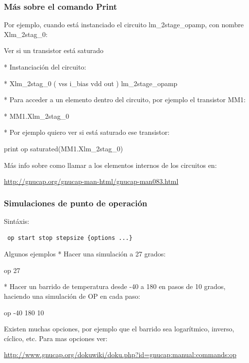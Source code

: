 \documentclass{beamer}
\begin{document}
\begin{frame}
  \frametitle{Más sobre el comando Print}

Por ejemplo, cuando está instanciado el circuito lm\_2stage\_opamp, con nombre Xlm\_2stag\_0:
\begin{exampleblock}{Ver si un transistor está saturado}

 * Instanciación del circuito:

 * Xlm\_2stag\_0 ( vss i\_bias vdd out )  lm\_2stage\_opamp 

 * Para acceder a un elemento dentro del circuito, por ejemplo el transistor MM1:

 * MM1.Xlm\_2stag\_0

 * Por ejemplo quiero ver si está saturado ese transistor:

  print op saturated(MM1.Xlm\_2stag\_0)
\end{exampleblock}
 Más info sobre como llamar a los elementos internos de los circuitos en:
  \begin{footnotesize}
   \url{http://gnucap.org/gnucap-man-html/gnucap-man083.html}
  \end{footnotesize}

\end{frame}
\begin{frame}[fragile]
  \frametitle{Simulaciones de punto de operación}

 Sintáxis:
 \begin{verbatim}
 op start stop stepsize {options ...} 
 \end{verbatim}
 \begin{exampleblock}{Algunos ejemplos}
   * Hacer una simulación a 27 grados:

   op 27

   * Hacer un barrido de temperatura desde -40 a 180 en pasos de 10 grados, haciendo una simulación de OP en cada paso:

   op -40 180 10
 \end{exampleblock}
 Existen muchas opciones, por ejemplo que el barrido sea logarítmico, inverso, cíclico, etc. Para mas opciones ver:
  \begin{tiny}
    \url{http://www.gnucap.org/dokuwiki/doku.php?id=gnucap:manual:commands:op}
  \end{tiny}

 


\end{frame}
\end{document}
